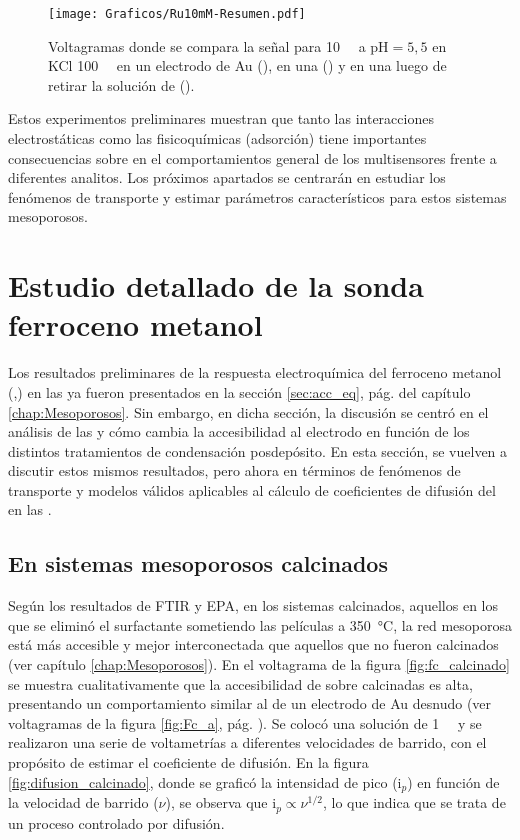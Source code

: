				\begin{figure}[h!]
				\centering
				\texttt{[image: Graficos/Ru10mM-Resumen.pdf]}
		        \caption{Voltagramas donde se compara la señal para \ru\space \SI{10}{\milli\Molar} a $\text{pH}=5,5$ en KCl \SI{100}{\milli\Molar} en un electrodo de Au (\usebox{\punteado}), en una \pdmF\space(\usebox{\gris}) y en una \pdmF\space luego de retirar la solución de \ru (\usebox{\negro}).}
		        \label{fig:Ru10mM-resumen}
		      	\end{figure}

		\vspace*{3mm}Estos experimentos preliminares muestran que tanto las interacciones electrostáticas como las fisicoquímicas (adsorción) tiene importantes consecuencias sobre en el comportamientos general de los multisensores frente a diferentes analitos. 
		Los próximos apartados se  centrarán en estudiar los fenómenos de transporte y estimar parámetros característicos para estos sistemas mesoporosos.

\section{Estudio detallado de la sonda ferroceno metanol}\label{sec:difusion}

	 Los resultados preliminares de la respuesta electroquímica del ferroceno metanol (\ferroceno,\fc) en las \pdmF\space ya fueron presentados en la sección \ref{sec:acc_eq}, pág. \pageref{sec:acc_eq} del capítulo \ref{chap:Mesoporosos}. Sin embargo, en dicha sección, la discusión se centró en el análisis de las \pdm\space y cómo cambia la accesibilidad al electrodo en función de los distintos tratamientos de condensación posdepósito.
	 En esta sección, se vuelven a discutir estos mismos resultados, pero ahora en términos de fenómenos de transporte y modelos válidos aplicables al cálculo de coeficientes de difusión del \fc\space en las \pdm.

	\subsection{En sistemas mesoporosos calcinados}

	 Según los resultados de FTIR y EPA, en los sistemas calcinados, aquellos en los que se eliminó el surfactante sometiendo las películas a \SI{350}{\celsius}, la red mesoporosa está más accesible y mejor interconectada que aquellos que no fueron calcinados (ver capítulo \ref{chap:Mesoporosos}). En el voltagrama de la figura \ref{fig:fc_calcinado} se muestra cualitativamente que la accesibilidad de \fc\space sobre \pdmF\space calcinadas es alta, presentando un comportamiento similar al de un electrodo de Au desnudo (ver voltagramas de la figura \ref{fig:Fc_a}, pág. \pageref{fig:Fc_a}). Se colocó una solución de \fc\space \SI{1}{\milli\Molar} y se realizaron una serie de voltametrías a diferentes velocidades de barrido, con el propósito de estimar el coeficiente de difusión. En la figura \ref{fig:difusion_calcinado}, donde se graficó la intensidad de pico (i$_p$) en función de la velocidad de barrido ($\nu$), se observa que $\text{i}_p \propto \nu^{1/2}$, lo que indica que se trata de un proceso controlado por difusión. 

